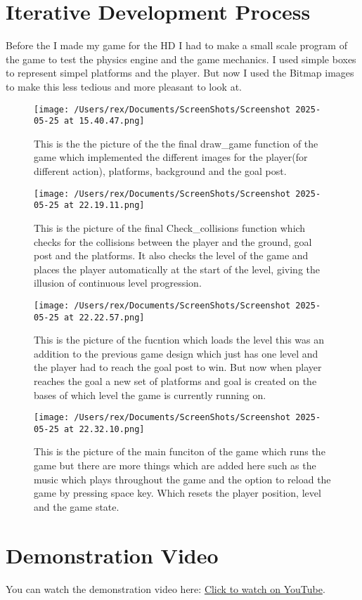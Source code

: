 \documentclass[11pt]{article}
\begin{document}
\section{Iterative Development Process}

Before the I made my game for the HD I had to make a small scale program of the game to test the physics engine and the game mechanics. I used simple boxes to represent simpel platforms and the player. But now I used the Bitmap images to make this less tedious and more pleasant to look at. 
\begin{figure}[!ht]
    \centering
    \texttt{[image: /Users/rex/Documents/ScreenShots/Screenshot 2025-05-25 at 15.40.47.png]}
    \caption{This is the the picture of the the final draw\_game function of the game which implemented the different images for the player(for different action), platforms, background and the goal post.}
\end{figure}

\begin{figure}[!ht]
    \centering
    \texttt{[image: /Users/rex/Documents/ScreenShots/Screenshot 2025-05-25 at 22.19.11.png]}
    \caption{This is the picture of the final Check\_collisions function which checks for the collisions between the player and the ground, goal post and the platforms. It also checks the level of the game and places the player automatically at the start of the level, giving the illusion of continuous level progression.}
\end{figure}

\begin{figure}[!ht]
    \centering
    \texttt{[image: /Users/rex/Documents/ScreenShots/Screenshot 2025-05-25 at 22.22.57.png]}
    \caption{This is the picture of the fucntion which loads the level this was an addition to the previous game design which just has one level and the player had to reach the goal post to win. But now when player reaches the goal a new set of platforms and goal is created on the bases of which level the game is currently running on.}
\end{figure}

\begin{figure}[!ht]
    \centering
    \texttt{[image: /Users/rex/Documents/ScreenShots/Screenshot 2025-05-25 at 22.32.10.png]}
    \caption{ This is the picture of the main funciton of the game which runs the game but there are more things which are added here such as the music which plays throughout the game and the option to reload the game by pressing space key. Which resets the player position, level and the game state.}
\end{figure}

\clearpage
\section{Demonstration Video}

You can watch the demonstration video here: \href{https://youtu.be/boPe4kzw5Eo}{Click to watch on YouTube}.
\end{document}
